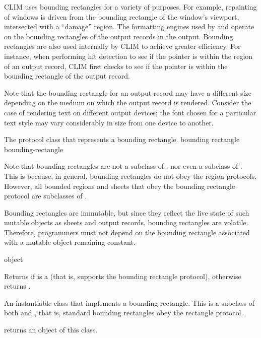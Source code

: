 CLIM uses bounding rectangles for a variety of purposes.  For example,
repainting of windows is driven from the bounding rectangle of the window's
viewport, intersected with a ``damage'' region.  The formatting engines used by
 and  operate on the bounding
rectangles of the output records in the output.  Bounding rectangles are also
used internally by CLIM to achieve greater efficiency.  For instance, when
performing hit detection to see if the pointer is within the region of an output
record, CLIM first checks to see if the pointer is within the bounding rectangle
of the output record.

Note that the bounding rectangle for an output record may have a different size
depending on the medium on which the output record is rendered.  Consider the
case of rendering text on different output devices; the font chosen for a
particular text style may vary considerably in size from one device to another.


The protocol class that represents a bounding rectangle.
 {bounding rectangle} {bounding-rectangle}

Note that bounding rectangles are not a subclass of , nor even a
subclass of .  This is because, in general, bounding rectangles do
not obey the region protocols.  However, all bounded regions and sheets that
obey the bounding rectangle protocol are subclasses of .

Bounding rectangles are immutable, but since they reflect the live state of such
mutable objects as sheets and output records, bounding rectangles are volatile.
Therefore, programmers must not depend on the bounding rectangle associated with
a mutable object remaining constant.

 {object}

Returns  if  is a  (that is,
supports the bounding rectangle protocol), otherwise returns .


An instantiable class that implements a bounding rectangle.  This is a subclass
of both  and , that is, standard bounding
rectangles obey the rectangle protocol.

 returns an object of this class.

